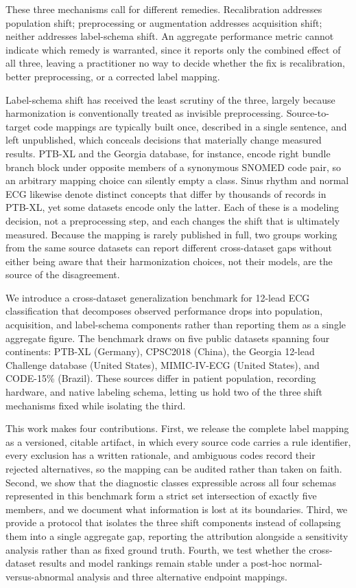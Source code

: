 \documentclass{article}
\begin{document}
These three mechanisms call for different remedies. Recalibration addresses population shift; preprocessing or augmentation addresses acquisition shift; neither addresses label-schema shift. An aggregate performance metric cannot indicate which remedy is warranted, since it reports only the combined effect of all three, leaving a practitioner no way to decide whether the fix is recalibration, better preprocessing, or a corrected label mapping.

Label-schema shift has received the least scrutiny of the three, largely because harmonization is conventionally treated as invisible preprocessing. Source-to-target code mappings are typically built once, described in a single sentence, and left unpublished, which conceals decisions that materially change measured results. PTB-XL and the Georgia database, for instance, encode right bundle branch block under opposite members of a synonymous SNOMED code pair, so an arbitrary mapping choice can silently empty a class. Sinus rhythm and normal ECG likewise denote distinct concepts that differ by thousands of records in PTB-XL, yet some datasets encode only the latter. Each of these is a modeling decision, not a preprocessing step, and each changes the shift that is ultimately measured. Because the mapping is rarely published in full, two groups working from the same source datasets can report different cross-dataset gaps without either being aware that their harmonization choices, not their models, are the source of the disagreement.

We introduce a cross-dataset generalization benchmark for 12-lead ECG classification that decomposes observed performance drops into population, acquisition, and label-schema components rather than reporting them as a single aggregate figure. The benchmark draws on five public datasets spanning four continents: PTB-XL (Germany), CPSC2018 (China), the Georgia 12-lead Challenge database (United States), MIMIC-IV-ECG (United States), and CODE-15\% (Brazil). These sources differ in patient population, recording hardware, and native labeling schema, letting us hold two of the three shift mechanisms fixed while isolating the third.

This work makes four contributions. First, we release the complete label mapping as a versioned, citable artifact, in which every source code carries a rule identifier, every exclusion has a written rationale, and ambiguous codes record their rejected alternatives, so the mapping can be audited rather than taken on faith. Second, we show that the diagnostic classes expressible across all four schemas represented in this benchmark form a strict set intersection of exactly five members, and we document what information is lost at its boundaries. Third, we provide a protocol that isolates the three shift components instead of collapsing them into a single aggregate gap, reporting the attribution alongside a sensitivity analysis rather than as fixed ground truth. Fourth, we test whether the cross-dataset results and model rankings remain stable under a post-hoc normal-versus-abnormal analysis and three alternative endpoint mappings.
\end{document}
